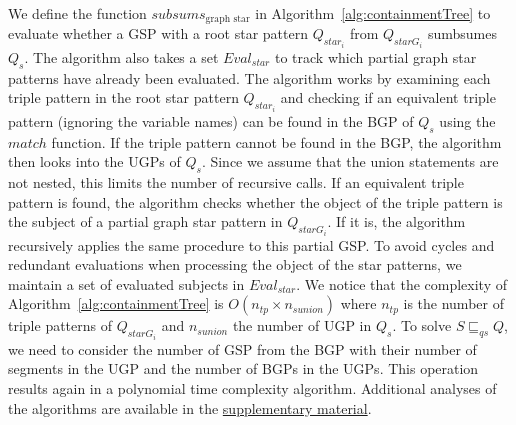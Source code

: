 We define the function $subsums_{\text{graph star}}$ in Algorithm~\ref{alg:containmentTree} to evaluate whether a GSP with a root star pattern $Q_{star_i}$ from $Q_{starG_i}$ sumbsumes $Q_s$. 
The algorithm also takes a set $Eval_{star}$ to track which partial graph star patterns have already been evaluated.
The algorithm works by examining each triple pattern in the root star pattern $Q_{star_i}$ and checking if an equivalent triple pattern (ignoring the variable names) can be found in the BGP of $Q_s$ using the $match$ function.
If the triple pattern cannot be found in the BGP, the algorithm then looks into the UGPs of $Q_s$. 
Since we assume that the union statements are not nested, this limits the number of recursive calls.
If an equivalent triple pattern is found, the algorithm checks whether the object of the triple pattern is the subject of a partial graph star pattern in $Q_{starG_i}$.
If it is, the algorithm recursively applies the same procedure to this partial GSP.
To avoid cycles and redundant evaluations when processing the object of the star patterns, we maintain a set of evaluated subjects in $Eval_{star}$.
We notice that the complexity of Algorithm~\ref{alg:containmentTree} is $O(n_{tp} \times n_{sunion})$
where $n_{tp}$ is the number of triple patterns of $Q_{starG_i}$ and $n_{sunion}$ the number of UGP in $Q_s$.
To solve $S \sqsubseteq_{qs} Q$, we need to consider the number of GSP from the BGP with their number of segments in the UGP and the number of BGPs in the UGPs.
This operation results again in a polynomial time complexity algorithm.
Additional analyses of the algorithms are available in the \hyperref[sec:supplementalMaterial]{supplementary material}.
